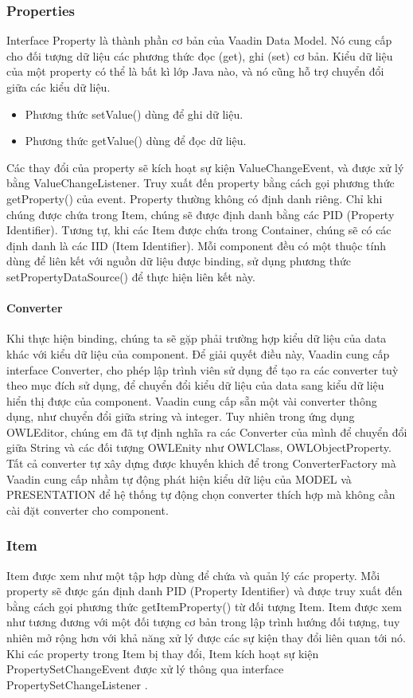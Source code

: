 \subsubsection{Properties}
Interface Property là thành phần cơ bản của Vaadin Data Model. Nó cung cấp cho đối tượng dữ liệu các phương thức đọc (get), ghi (set) cơ bản. Kiểu dữ liệu của một property có thể là bất kì lớp Java nào, và nó cũng hỗ trợ chuyển đổi giữa các kiểu dữ liệu.
\begin{itemize}
\item Phương thức setValue() dùng để ghi dữ liệu.
\item Phương thức getValue() dùng để đọc dữ liệu.
\end{itemize}
Các thay đổi của property sẽ kích hoạt sự kiện ValueChangeEvent, và được xử lý bằng ValueChangeListener. Truy xuất đến property bằng cách gọi phương thức getProperty() của event. Property thường không có định danh riêng. Chỉ khi chúng được chứa trong Item, chúng sẽ được định danh bằng các PID (Property Identifier). Tương tự, khi các Item được chứa trong Container, chúng sẽ có các định danh là các IID (Item Identifier). Mỗi component đều có một thuộc tính dùng để liên kết với nguồn dữ liệu được binding, sử dụng phương thức setPropertyDataSource() để thực hiện liên kết này.
\paragraph{Converter} Khi thực hiện binding, chúng ta sẽ gặp phải trường hợp kiểu dữ liệu của data khác với kiểu dữ liệu của component. Để giải quyết điều này, Vaadin cung cấp interface Converter, cho phép lập trình viên sử dụng để tạo ra các converter tuỳ theo mục đích sử dụng, để chuyển đổi kiểu dữ liệu của data sang kiểu dữ liệu hiển thị được của component. Vaadin cung cấp sẵn một vài converter thông dụng, như chuyển đổi giữa string và integer. Tuy nhiên trong ứng dụng OWLEditor, chúng em đã tự định nghĩa ra các Converter của mình để chuyển đổi giữa String và các đối tượng OWLEnity như OWLClass, OWLObjectProperty. Tất cả converter tự xây dựng được khuyến khich để trong ConverterFactory mà Vaadin cung cấp nhầm tự động phát hiện kiểu dữ liệu của MODEL và PRESENTATION để hệ thống tự động chọn converter thích hợp mà không cần cài đặt converter cho component.
\subsubsection{Item} Item được xem như một tập hợp dùng để chứa và quản lý các property. Mỗi property sẽ được gán định danh PID (Property Identifier) và được truy xuất đến bằng cách gọi phương thức getItemProperty() từ đối tượng Item. Item được xem như tương đương với một đối tượng cơ bản trong lập trình hướng đối tượng, tuy nhiên mở rộng hơn với khả năng xử lý được các sự kiện thay đổi liên quan tới nó. Khi các property trong Item bị thay đổi, Item kích hoạt sự kiện PropertySetChangeEvent được xử lý thông qua interface PropertySetChangeListener .
